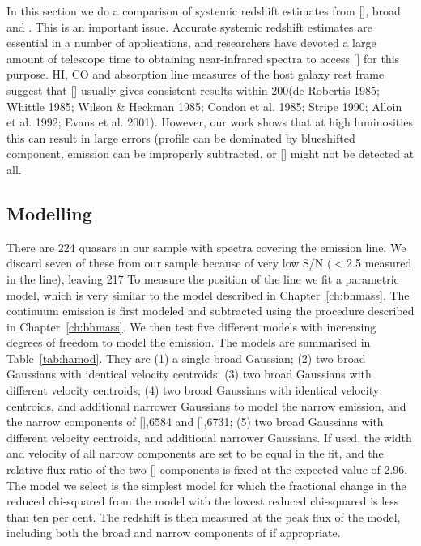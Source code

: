 In this section we do a comparison of systemic redshift estimates from [], broad \hb and \hans. 
This is an important issue. 
Accurate systemic redshift estimates are essential in a number of applications, and researchers have devoted a large amount of telescope time to obtaining near-infrared spectra to access [] for this purpose. 
HI, CO and absorption line measures of the host galaxy rest frame suggest that [] usually gives consistent results within 200\kms (de Robertis 1985; Whittle 1985; Wilson \& Heckman 1985; Condon et al. 1985; Stripe 1990; Alloin et al. 1992; Evans et al. 2001).  
However, our work shows that at high luminosities this can result in large errors (profile can be dominated by blueshifted component,  emission can be improperly subtracted, or [] might not be detected at all. 

\subsection{Modelling \hans}

There are 224 quasars in our sample with spectra covering the \ha emission line. 
We discard seven of these from our sample because of very low \ac{S/N} ($<$2.5 measured in the \ha line), leaving 217
To measure the position of the line we fit a parametric model, which is very similar to the model described in Chapter~\ref{ch:bhmass}. 
The continuum emission is first modeled and subtracted using the procedure described in Chapter~\ref{ch:bhmass}. 
We then test five different models with increasing degrees of freedom to model the \ha emission. 
The models are summarised in Table~\ref{tab:hamod}. 
They are (1) a single broad Gaussian; (2) two broad Gaussians with identical velocity centroids; (3) two broad Gaussians with different velocity centroids; (4) two broad Gaussians with identical velocity centroids, and additional narrower Gaussians to model the narrow \ha emission, and the narrow components of [],6584 and [],6731; (5) two broad Gaussians with different velocity centroids, and additional narrower Gaussians. 
If used, the width and velocity of all narrow components are set to be equal in the fit, and the relative flux ratio of the two [] components is fixed at the expected value of 2.96.
The model we select is the simplest model for which the fractional change in the reduced chi-squared from the model with the lowest reduced chi-squared is less than ten per cent. 
The redshift is then measured at the peak flux of the \ha model, including both the broad and narrow components of \ha if appropriate. 

